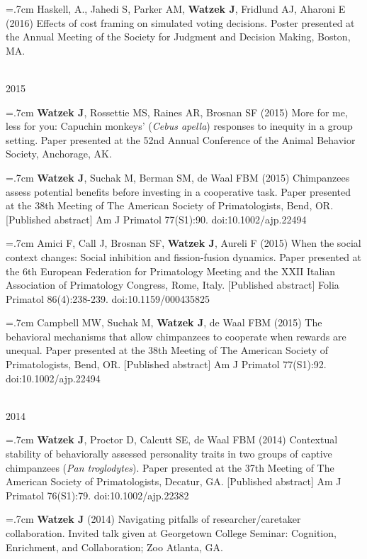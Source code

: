 \documentclass[]{friggeri-cv}
\begin{document}
\hangindent=.7cm Haskell, A., Jahedi S, Parker AM, \textbf{Watzek J}, Fridlund AJ, Aharoni E (2016) Effects of cost framing on simulated voting decisions. Poster presented at the Annual Meeting of the Society for Judgment and Decision Making, Boston, MA.


{\large{} ~\\[-.15cm] 2015}

\hangindent=.7cm \textbf{Watzek J}, Rossettie MS, Raines AR, Brosnan SF (2015) More for me, less for you: Capuchin monkeys' (\emph{Cebus apella}) responses to inequity in a group setting. Paper presented at the 52nd Annual Conference of the Animal Behavior Society, Anchorage, AK.

\hangindent=.7cm \textbf{Watzek J}, Suchak M, Berman SM, de Waal FBM (2015) Chimpanzees assess potential benefits before investing in a cooperative task. Paper presented at the 38th Meeting of The American Society of Primatologists, Bend, OR. [Published abstract] Am J Primatol 77(S1):90. doi:10.1002/ajp.22494

\hangindent=.7cm Amici F, Call J, Brosnan SF, \textbf{Watzek J}, Aureli F (2015) When the social context changes: Social inhibition and fission-fusion dynamics. Paper presented at the 6th European Federation for Primatology Meeting and the XXII Italian Association of Primatology Congress, Rome, Italy. [Published abstract] Folia Primatol 86(4):238-239. doi:10.1159/000435825

\hangindent=.7cm Campbell MW, Suchak M, \textbf{Watzek J}, de Waal FBM (2015) The behavioral mechanisms that allow chimpanzees to cooperate when rewards are unequal. Paper presented at the 38th Meeting of The American Society of Primatologists, Bend, OR. [Published abstract] Am J Primatol 77(S1):92. doi:10.1002/ajp.22494


{\large{} ~\\[-.15cm] 2014}

\hangindent=.7cm \textbf{Watzek J}, Proctor D, Calcutt SE, de Waal FBM (2014) Contextual stability of behaviorally assessed personality traits in two groups of captive chimpanzees (\emph{Pan troglodytes}). Paper presented at the 37th Meeting of The American Society of Primatologists, Decatur, GA. [Published abstract] Am J Primatol 76(S1):79. doi:10.1002/ajp.22382

\hangindent=.7cm \textbf{Watzek J} (2014) Navigating pitfalls of researcher/caretaker collaboration. Invited talk given at Georgetown College Seminar: Cognition, Enrichment, and Collaboration; Zoo Atlanta, GA.
\end{document}
